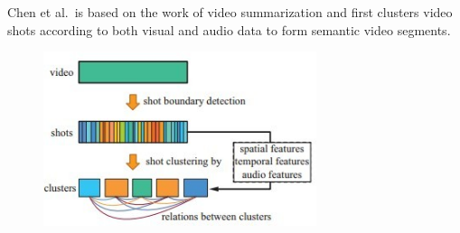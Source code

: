 \documentclass{egpubl}
\begin{document}
Chen et al.\ is based on the work of video summarization \cite{yahiaoui2001automatic} and first clusters video shots according
to both visual and audio data to form semantic video segments.
\begin{figure}
\begingroup
\centering
\includegraphics[width=8cm]{./images/chen2012}
\label{chen2012}
\endgroup
\end{figure}
\end{document}
